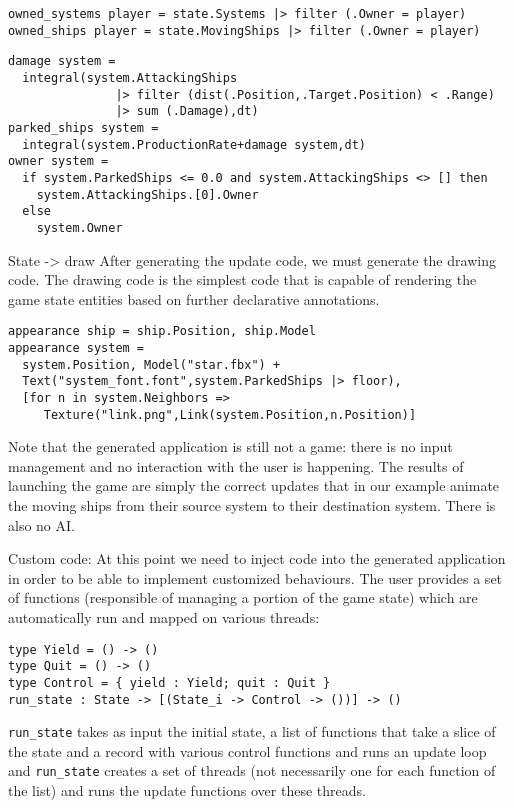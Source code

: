 \begin{lstlisting}
owned_systems player = state.Systems |> filter (.Owner = player)
owned_ships player = state.MovingShips |> filter (.Owner = player)
\end{lstlisting}

\begin{lstlisting}
damage system =
  integral(system.AttackingShips 
               |> filter (dist(.Position,.Target.Position) < .Range)
               |> sum (.Damage),dt)
parked_ships system =
  integral(system.ProductionRate+damage system,dt)
owner system = 
  if system.ParkedShips <= 0.0 and system.AttackingShips <> [] then
    system.AttackingShips.[0].Owner
  else
    system.Owner
\end{lstlisting}


State -> draw 
After generating the update code, we must generate the drawing code. The drawing code is the simplest code that is capable of rendering the game state entities based on further declarative annotations.

\begin{lstlisting}
appearance ship = ship.Position, ship.Model
appearance system = 
  system.Position, Model("star.fbx") +
  Text("system_font.font",system.ParkedShips |> floor),
  [for n in system.Neighbors =>
     Texture("link.png",Link(system.Position,n.Position)]
\end{lstlisting}

Note that the generated application is still not a game: there is no input management and no interaction with the user is happening. The results of launching the game are simply the correct updates that in our example animate the moving ships from their source system to their destination system. There is also no AI.


Custom code:
At this point we need to inject code into the generated application in order to be able to implement customized behaviours. The user provides a set of functions (responsible of managing a portion of the game state) which are automatically run and mapped on various threads:

\begin{lstlisting}
type Yield = () -> ()
type Quit = () -> ()
type Control = { yield : Yield; quit : Quit }
run_state : State -> [(State_i -> Control -> ())] -> ()
\end{lstlisting}

\texttt{run\_state} takes as input the initial state, a list of functions that take a slice of the state and a record with various control functions and runs an update loop and \texttt{run\_state} creates a set of threads (not necessarily one for each function of the list) and runs the update functions over these threads.

